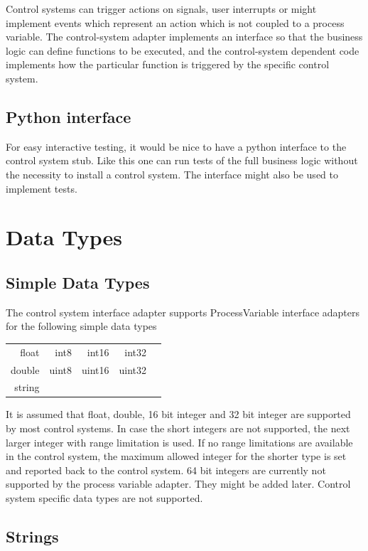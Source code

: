 \documentclass[11pt,a4paper]{scrartcl}
\begin{document}
Control systems can trigger actions on signals, user interrupts or might
implement events which represent an action which is not coupled to a process
variable. The control-system adapter implements an interface so that the
business logic can define functions to be executed, and the control-system
dependent code implements how the particular function is triggered by the
specific control system. 

\subsection{Python interface}

For easy interactive testing, it would be nice to have a python interface to
the control system stub. Like this one can run tests of the full business
logic without the necessity to install a control system. The interface might
also be used to implement tests. 

\section{Data Types}

\subsection{Simple Data Types}

The control system interface adapter supports ProcessVariable interface
adapters for the following simple data types\\[2ex] 
\begin{tabular}{rrrrr}
float & int8 & int16 & int32\\
double & uint8 & uint16 & uint32\\
string\\[2ex]
\end{tabular}

It is assumed that float, double, 16 bit integer and 32 bit integer are
supported by most control systems.
In case the short integers are not supported, the next larger
integer with range limitation is used. If no range limitations are available
in the control system, the maximum allowed integer for the shorter type is set
and reported back to the control system. 64 bit integers are currently not supported 
by the process variable adapter. They might be added later.
Control system specific data types are not supported.

\subsection{Strings}
\end{document}
